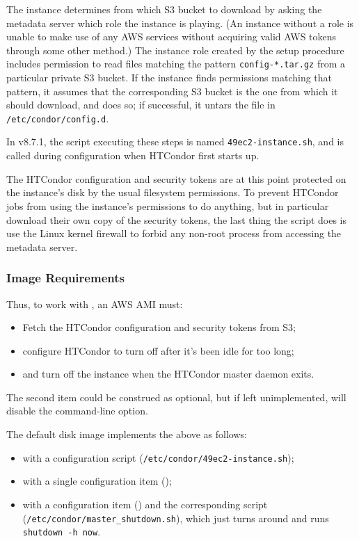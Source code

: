 The instance determines from which S3 bucket to download by asking the
metadata server which role the instance is playing.  (An instance without
a role is unable to make use of any AWS services without acquiring valid
AWS tokens through some other method.)  The instance role created by
the setup procedure includes permission to read files matching the pattern
{\tt config-*.tar.gz} from a particular private S3 bucket.  If the instance
finds permissions matching that pattern, it assumes that the corresponding
S3 bucket is the one from which it should download, and does so; if
successful, it untars the file in {\tt /etc/condor/config.d}.

In v8.7.1, the script executing these steps is named {\tt49ec2-instance.sh},
and is called during configuration when HTCondor first starts up.

The HTCondor configuration and security tokens are at this point protected
on the instance's disk by the usual filesystem permissions.  To prevent
HTCondor jobs from using the instance's permissions to do anything, but
in particular download their own copy of the security tokens, the last
thing the script does is use the Linux kernel firewall to forbid any
non-root process from accessing the metadata server.

\subsubsection{Image Requirements}

Thus, to work with , an AWS AMI must:

\begin{itemize}
\item  Fetch the HTCondor configuration and security tokens from S3;
\item  configure HTCondor to turn off after it's been idle for too long;
\item  and turn off the instance when the HTCondor master daemon exits.
\end{itemize}

The second item could be construed as optional, but if left unimplemented,
will disable the  command-line option.

The default disk image implements the above as follows:

\begin{itemize}
\item  with a configuration script ({\tt /etc/condor/49ec2-instance.sh});
\item  with a single configuration item ();
\item  with a configuration item ()
and the corresponding script ({\tt /etc/condor/master\_shutdown.sh}), which
just turns around and runs {\tt shutdown -h now}.
\end{itemize}

